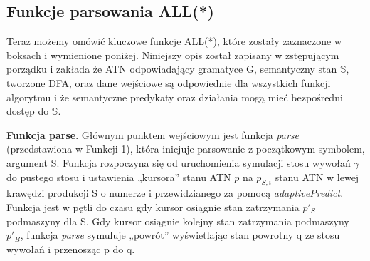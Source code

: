 \subsection{Funkcje parsowania ALL(*)}
Teraz możemy omówić kluczowe funkcje ALL(*), które zostały zaznaczone w boksach
i wymienione poniżej. Niniejszy opis został zapisany w zstępującym porządku i zakłada
że ATN odpowiadający gramatyce G, semantyczny stan $\mathbb{S}$, tworzone DFA, oraz dane wejściowe
są odpowiednie dla wszystkich funkcji algorytmu i że semantyczne predykaty oraz działania
mogą mieć bezpośredni dostęp do $\mathbb{S}$.
\par
\textbf{Funkcja parse}. Głównym punktem wejściowym jest funkcja \textit{parse}
(przedstawiona w Funkcji 1), która inicjuje parsowanie z początkowym symbolem, argument S.
Funkcja rozpoczyna się od uruchomienia symulacji stosu wywołań $\gamma$ do pustego stosu
i ustawienia „kursora” stanu ATN $p$ na $p_{S,i}$ stanu ATN w lewej krawędzi produkcji S
o numerze i przewidzianego za pomocą \textit{adaptivePredict}.
Funkcja jest w pętli do czasu gdy kursor osiągnie stan zatrzymania $p'_S$ podmaszyny dla S.
Gdy kursor osiągnie kolejny stan zatrzymania podmaszyny $p'_B$, funkcja \textit{parse}
symuluje „powrót” wyświetlając stan powrotny q ze stosu wywołań i przenosząc p do q.
\\
